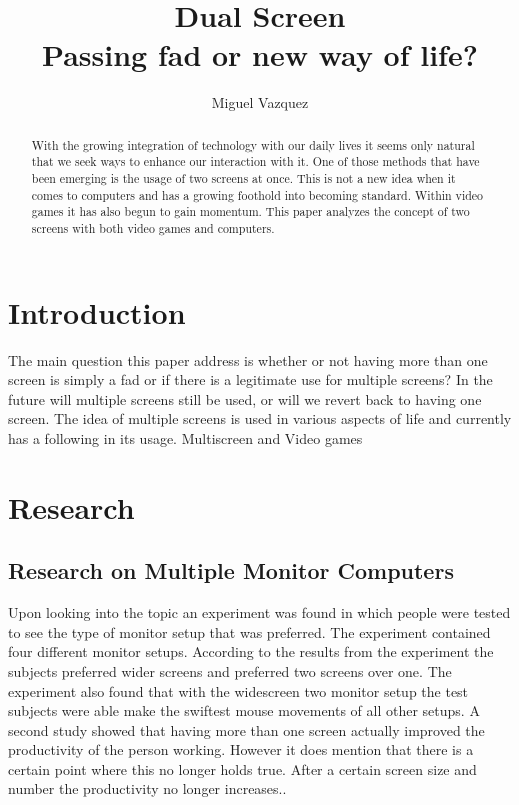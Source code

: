 \documentclass[11pt]{article}
\title{\textbf{Dual Screen} \\Passing fad or new way of life?}
\author{Miguel Vazquez}
\begin{document}
\maketitle
\begin{abstract}
With the growing integration of technology with our daily lives it seems only natural that we seek ways to enhance our interaction with it. One of those methods that have been emerging is the usage of two screens at once. This is not a new idea when it comes to computers and has a growing foothold into becoming standard. Within video games it has also begun to gain momentum. This paper analyzes the concept of two screens with both video games and computers.
\end{abstract}

\tableofcontents

\section{Introduction}
The main question this paper address is whether or not having more than one screen is simply a fad or if there is a legitimate use for multiple screens? In the future will multiple screens still be used, or will we revert back to having one screen. The idea of multiple screens is used in various aspects of life and currently has a following in its usage.
Multiscreen and Video games

\section{Research}
\subsection{Research on Multiple Monitor Computers}
Upon looking into the topic an experiment was found\cite{monitors} in which people were tested to see the type of monitor setup that was preferred. The experiment contained four different monitor setups. According to the results from the experiment the subjects preferred wider screens and preferred two screens over one. The experiment also found that with the widescreen two monitor setup the test subjects were able make the swiftest mouse movements of all other setups. A second study \cite{monitors2} showed that having more than one screen actually improved the productivity of the person working. However it does mention that there is a certain point where this no longer holds true. After a certain screen size and number the productivity no longer increases..
\end{document}
